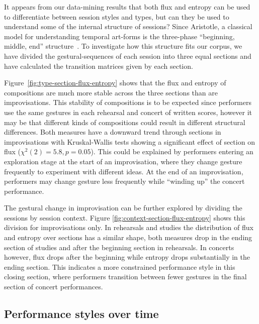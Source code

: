 \documentclass{sigchi}
\begin{document}
It appears from our data-mining results that both flux and entropy can be used to
differentiate between session styles and types, but can they be
used to understand some of the internal structure of sessions? Since Aristotle, a
classical model for understanding temporal art-forms is the three-phase
``beginning, middle, end'' structure~\cite{Aristotle:350rt}. To
investigate how this structure fits our corpus, we have divided the
gestural-sequences of each session into three equal sections and have calculated the
transition matrices given by each section.

Figure~\ref{fig:type-section-flux-entropy} shows that the flux and
entropy of compositions are much more stable across the three sections than  are
improvisations. This stability of compositions is to be
expected since performers use the same gestures in each rehearsal and
concert of written scores, however it may be that different
kinds of compositions could result in different structural
differences. Both measures have a downward trend through sections in
improvisations with Kruskal-Wallis tests showing a significant effect
of section on flux ($\chi^2(2)=5.8, p=0.05$). This could be explained
by performers entering an exploration stage at the start of an
improvisation, where they change gesture frequently to experiment with
different ideas. At the end of an improvisation, performers may change
gesture less frequently while ``winding up'' the concert performance.

The gestural change in improvisation can be further explored by
dividing the sessions by session context. Figure
\ref{fig:context-section-flux-entropy} shows this division for
improvisations only. In rehearsals and studies the distribution of
flux and entropy over sections has a similar shape, both measures drop
in the ending section of studies and after the beginning section in
rehearsals. In concerts however, flux drops after the beginning
while entropy drops substantially in the ending section. This
indicates a more constrained performance style in this closing
section, where performers transition between fewer gestures in the
final section of concert performances.

\subsection{Performance styles over time}
\end{document}
